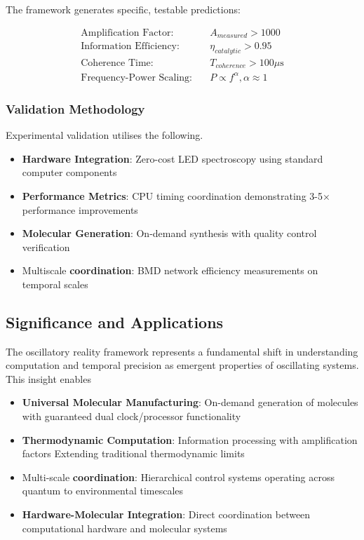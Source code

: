 \documentclass[12pt,a4paper]{article}
\begin{document}
The framework generates specific, testable predictions:

\begin{align}
\text{Amplification Factor}: \quad &A_{measured} > 1000 \\
\text{Information Efficiency}: \quad &\eta_{catalytic} > 0.95 \\
\text{Coherence Time}: \quad &T_{coherence} > 100 \mu\text{s} \\
\text{Frequency-Power Scaling}: \quad &P \propto f^{\alpha}, \alpha \approx 1
\end{align}

\subsubsection{Validation Methodology}

Experimental validation utilises the following.
\begin{itemize}
\item \textbf{Hardware Integration}: Zero-cost LED spectroscopy using standard computer components
\item \textbf{Performance Metrics}: CPU timing coordination demonstrating 3-5× performance improvements
\item \textbf{Molecular Generation}: On-demand synthesis with quality control verification 
\item Multiscale \textbf{coordination}: BMD network efficiency measurements on temporal scales \cite{vedral2011living}
\end{itemize}

\subsection{Significance and Applications}

The oscillatory reality framework represents a fundamental shift in understanding computation and temporal precision as emergent properties of oscillating systems. This insight enables

\begin{itemize}
\item \textbf{Universal Molecular Manufacturing}: On-demand generation of molecules with guaranteed dual clock/processor functionality
\item \textbf{Thermodynamic Computation}: Information processing with amplification factors Extending traditional thermodynamic limits
\item Multi-scale \textbf{coordination}: Hierarchical control systems operating across quantum to environmental timescales
\item \textbf{Hardware-Molecular Integration}: Direct coordination between computational hardware and molecular systems
\end{itemize}
\end{document}
